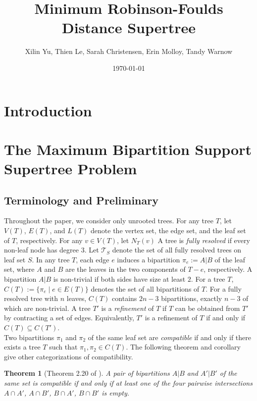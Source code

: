 \documentclass{article}
\title{Minimum Robinson-Foulds Distance Supertree}
\author{Xilin Yu, Thien Le, Sarah Christensen,  Erin Molloy, Tandy Warnow}
\date{\today}
\newtheorem{theorem}{Theorem}
\begin{document}
\maketitle

\section{Introduction}






\section{The Maximum Bipartition Support Supertree Problem} \label{sec:alg}
\subsection{Terminology and Preliminary}

Throughout the paper, we consider only unrooted trees. For any tree $T$, let $V(T)$, $E(T)$, and $L(T)$ denote the vertex set, the edge set, and the leaf set of $T$, respectively. For any $v\in V(T)$, let $N_T(v)$  A tree is \textit{fully resolved} if every non-leaf node has degree $3$. Let $\mathcal{T}_S$ denote the set of all fully resolved trees on leaf set $S$. In any tree $T$, each edge $e$ induces a bipartition $\pi_e := A|B$ of the leaf set, where $A$ and $B$ are the leaves in the two components of $T-e$, respectively. A bipartition $A|B$ is non-trivial if both sides have size at least $2$. For a tree $T$, $C(T) := \{\pi_e \mid e\in E(T)\}$ denotes the set of all bipartitions of $T$. For a fully resolved tree with $n$ leaves, $C(T)$ contains $2n-3$ bipartitions, exactly $n-3$ of which are non-trivial. A tree $T'$ is a \textit{refinement} of $T$ if $T$ can be obtained from $T'$ by contracting a set of edges. Equivalently, $T'$ is a refinement of $T$ if and only if $C(T) \subseteq C(T')$.\\

Two bipartitions $\pi_1$ and $\pi_2$ of the same leaf set are \textit{compatible} if and only if there exists a tree $T$ such that $\pi_1, \pi_2 \in C(T)$. The following theorem and corollary give other categorizations of compatibility.
\begin{theorem}[Theorem 2.20 of \cite{warnow2017computational}]\label{thm:compatibility}
    A pair of bipartitions $A|B$ and $A'|B'$ of the same set is compatible if and only if at least one of the four pairwise intersections $A \cap A'$, $A\cap B'$, $B\cap A'$, $B \cap B'$ is empty. 
\end{theorem}
\end{document}
